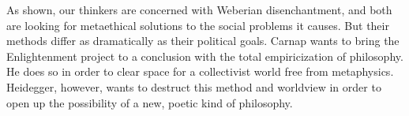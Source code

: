 \documentclass[leqno, 12pt]{turabian-researchpaper}
\begin{document}
	As shown, our thinkers are concerned with Weberian disenchantment, and both are
	looking for metaethical solutions to the social problems it causes. But their
	methods differ as dramatically as their political goals. Carnap wants to bring
	the Enlightenment project to a conclusion with the total empiricization of philosophy.
	He does so in order to clear space for a collectivist world free from
	metaphysics. Heidegger, however, wants to destruct this method and worldview in
	order to open up the possibility of a new, poetic kind of philosophy.


\end{document}
